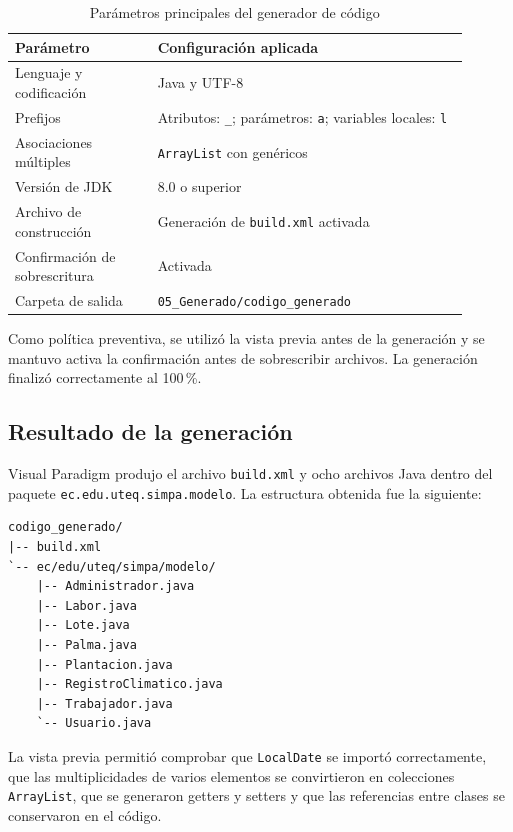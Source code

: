 \begin{table}[htbp]
\centering
\small
\caption{Parámetros principales del generador de código}
\begin{tabular}{|p{0.29\linewidth}|p{0.61\linewidth}|}
\hline
\textbf{Parámetro} & \textbf{Configuración aplicada} \\
\hline
Lenguaje y codificación & Java y UTF-8 \\
\hline
Prefijos & Atributos: \texttt{\_}; parámetros: \texttt{a}; variables locales: \texttt{l} \\
\hline
Asociaciones múltiples & \texttt{ArrayList} con genéricos \\
\hline
Versión de JDK & 8.0 o superior \\
\hline
Archivo de construcción & Generación de \texttt{build.xml} activada \\
\hline
Confirmación de sobrescritura & Activada \\
\hline
Carpeta de salida & \texttt{05\_Generado/codigo\_generado} \\
\hline
\end{tabular}
\end{table}

Como política preventiva, se utilizó la vista previa antes de la generación y se mantuvo activa la confirmación antes de sobrescribir archivos. La generación finalizó correctamente al 100\,\%.

\subsection{Resultado de la generación}

Visual Paradigm produjo el archivo \texttt{build.xml} y ocho archivos Java dentro del paquete \texttt{ec.edu.uteq.simpa.modelo}. La estructura obtenida fue la siguiente:

\begin{verbatim}
codigo_generado/
|-- build.xml
`-- ec/edu/uteq/simpa/modelo/
    |-- Administrador.java
    |-- Labor.java
    |-- Lote.java
    |-- Palma.java
    |-- Plantacion.java
    |-- RegistroClimatico.java
    |-- Trabajador.java
    `-- Usuario.java
\end{verbatim}

La vista previa permitió comprobar que \texttt{LocalDate} se importó correctamente, que las multiplicidades de varios elementos se convirtieron en colecciones \texttt{ArrayList}, que se generaron getters y setters y que las referencias entre clases se conservaron en el código.

